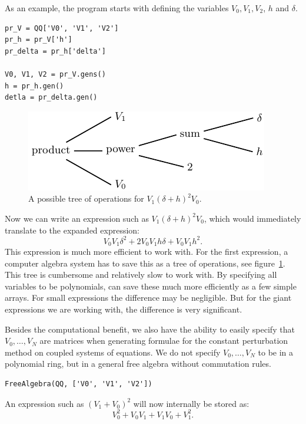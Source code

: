 As an example, the \sage{} program starts with defining the variables $V_0, V_1, V_2$, $h$ and $\delta$.
\begin{verbatim}
pr_V = QQ['V0', 'V1', 'V2']
pr_h = pr_V['h']
pr_delta = pr_h['delta']

V0, V1, V2 = pr_V.gens()
h = pr_h.gen()
detla = pr_delta.gen()
\end{verbatim}

\begin{figure}
    \begin{center}
        \includegraphics{img/chapter2/sage_operations/tree.pdf}
    \end{center}
    \caption{A possible tree of operations for $V_1 (\delta+h)^2 V_0$.}\label{fig:c2_operations_tree}
\end{figure}

Now we can write an expression such as $V_1 (\delta + h)^2 V_0$, which \sage{} would immediately translate to the expanded expression:
$$
    V_{0} V_{1} \delta^{2} + 2 V_{0} V_{1} h \delta + V_{0} V_{1} h^{2}\text{.}
$$
This expression is much more efficient to work with. For the first expression, a computer algebra system has to save this as a tree of operations, see figure~\ref{fig:c2_operations_tree}. This tree is cumbersome and relatively slow to work with. By specifying all variables to be polynomials, \sage{} can save these much more efficiently as a few simple arrays. For small expressions the difference may be negligible. But for the giant expressions we are working with, the difference is very significant.

Besides the computational benefit, we also have the ability to easily specify that $V_0, \dots, V_N$ are matrices when generating formulae for the constant perturbation method on coupled systems of equations. We do not specify $V_0, \dots, V_N$ to be in a polynomial ring, but in a general free algebra without commutation rules.
\begin{verbatim}
FreeAlgebra(QQ, ['V0', 'V1', 'V2'])
\end{verbatim}
An expression such as $(V_1 + V_0)^2$ will now internally be stored as:
$$
    V_{0}^{2} + V_{0} V_{1} + V_{1} V_{0} + V_{1}^{2}\text{.}
$$


